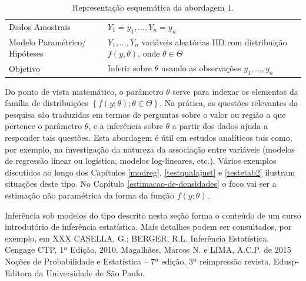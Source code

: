 \documentclass[]{book}
\theoremstyle{definition}
\theoremstyle{definition}
\theoremstyle{definition}
\theoremstyle{remark}
\begin{document}
\begin{longtable}[]{@{}ll@{}}
\caption{\label{tab:modelclass} Representação esquemática da abordagem
1.}\tabularnewline
\toprule
\begin{minipage}[t]{0.29\columnwidth}\raggedright\strut
Dados Amostrais\strut
\end{minipage} & \begin{minipage}[t]{0.60\columnwidth}\raggedright\strut
\(Y_1=y_1,\ldots, Y_n=y_n\)\strut
\end{minipage}\tabularnewline
\begin{minipage}[t]{0.29\columnwidth}\raggedright\strut
Modelo Paramétrico/ Hipóteses\strut
\end{minipage} & \begin{minipage}[t]{0.60\columnwidth}\raggedright\strut
\(Y_1,\ldots,Y_n\) variáveis aleatórias IID com distribuição
\(f(y,\theta)\), onde \(\theta \in \Theta\)\strut
\end{minipage}\tabularnewline
\begin{minipage}[t]{0.29\columnwidth}\raggedright\strut
Objetivo\strut
\end{minipage} & \begin{minipage}[t]{0.60\columnwidth}\raggedright\strut
Inferir sobre \(\theta\) usando as observações \(y_1, \ldots,y_n\)\strut
\end{minipage}\tabularnewline
\bottomrule
\end{longtable}

Do ponto de vista matemático, o parâmetro \(\theta\) serve para indexar
os elementos da família de distribuições
\(\left\{f\left( y;\theta \right);\theta \in \Theta \right\}\). Na
prática, as questões relevantes da pesquisa são traduzidas em termos de
perguntas sobre o valor ou região a que pertence o parâmetro \(\theta\),
e a inferência sobre \(\theta\) a partir dos dados ajuda a responder
tais questões. Esta abordagem é útil em estudos analíticos tais como,
por exemplo, na investigação da natureza da associação entre variáveis
(modelos de regressão linear ou logística, modelos log-lineares, etc.).
Vários exemplos discutidos ao longo dos Capítulos \ref{modreg},
\ref{testqualajust} e \ref{testetab2} ilustram situações deste tipo. No
Capítulo \ref{estimacao-de-densidades} o foco vai ser a estimação não
paramétrica da forma da função \(f(y;\theta)\).

Inferência sob modelos do tipo descrito nesta seção forma o conteúdo de
um curso introdutório de inferência estatística. Mais detalhes podem ser
consultados, por exemplo, em XXX CASELLA, G.; BERGER, R.L. Inferência
Estatística. Cengage CTP, 1ª Edição, 2010. Magalhães, Marcos N. e LIMA,
A.C.P. de 2015 Noções de Probabilidade e Estatística -- 7ª edição, 3ª
reimpressão revista, Edusp- Editora da Universidade de São Paulo.
\end{document}

